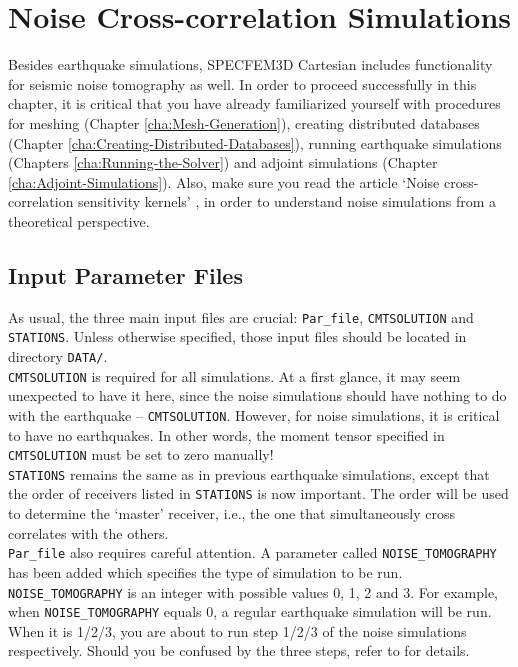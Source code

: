 \chapter{Noise Cross-correlation Simulations}


Besides earthquake simulations, SPECFEM3D Cartesian includes functionality
for seismic noise tomography as well. In order to proceed successfully
in this chapter, it is critical that you have already familiarized
yourself with procedures for meshing (Chapter \ref{cha:Mesh-Generation}),
creating distributed databases (Chapter \ref{cha:Creating-Distributed-Databases}),
running earthquake simulations (Chapters \ref{cha:Running-the-Solver})
and adjoint simulations (Chapter \ref{cha:Adjoint-Simulations}).
Also, make sure you read the article `Noise cross-correlation sensitivity
kernels' \citep{trompetal2010}, in order to understand noise simulations
from a theoretical perspective.


\section{Input Parameter Files}

As usual, the three main input files are crucial: \texttt{Par\_file},
\texttt{CMTSOLUTION} and \texttt{STATIONS}. Unless otherwise specified,
those input files should be located in directory \texttt{DATA/}.\\


\texttt{CMTSOLUTION} is required for all simulations. At a first glance,
it may seem unexpected to have it here, since the noise simulations
should have nothing to do with the earthquake -- \texttt{CMTSOLUTION}.
However, for noise simulations, it is critical to have no earthquakes.
In other words, the moment tensor specified in \texttt{CMTSOLUTION}
must be set to zero manually!\\


\texttt{STATIONS} remains the same as in previous earthquake simulations,
except that the order of receivers listed in \texttt{STATIONS} is
now important. The order will be used to determine the `master' receiver,
i.e., the one that simultaneously cross correlates with the others.\\


\texttt{Par\_file} also requires careful attention. A parameter called
\texttt{NOISE\_TOMOGRAPHY} has been added which specifies the type
of simulation to be run. \texttt{NOISE\_TOMOGRAPHY} is an integer
with possible values 0, 1, 2 and 3. For example, when \texttt{NOISE\_TOMOGRAPHY}
equals 0, a regular earthquake simulation will be run. When it is
1/2/3, you are about to run step 1/2/3 of the noise simulations respectively.
Should you be confused by the three steps, refer to \citet{trompetal2010}
for details.\\


